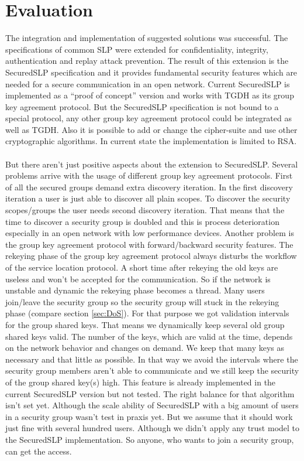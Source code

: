 \section{Evaluation}\label{sec:evaluation}
The integration and implementation of suggested solutions was successful. The specifications of common SLP were extended for confidentiality, integrity, authentication and replay attack prevention. The result of this extension is the SecuredSLP specification and it provides fundamental security features which are needed for a secure communication in an open network. Current SecuredSLP is implemented as a ``proof of concept'' version and works with TGDH as its group key agreement protocol. But the SecuredSLP specification is not bound to a special protocol, any other group key agreement protocol could be integrated as well as TGDH. Also it is possible to add or change the cipher-suite and use other cryptographic algorithms. In current state the implementation is limited to RSA.\\\\
But there aren't just positive aspects about the extension to SecuredSLP. Several problems arrive with the usage of different group key agreement protocols. First of all the secured groups demand extra discovery iteration. In the first discovery iteration a user is just able to discover all plain scopes. To discover the security scopes/groups the user needs second discovery iteration. That means that the time to discover a security group is doubled and this is process deterioration especially in an open network with low performance devices. Another problem is the group key agreement protocol with forward/backward security features. The rekeying phase of the group key agreement protocol always disturbs the workflow of the service location protocol. A short time after rekeying the old keys are useless and won't be accepted for the communication. So if the network is unstable and dynamic the rekeying phase becomes a thread. Many users join/leave the security group so the security group will stuck in the rekeying phase (compare section \ref{sec:DoS}). For that purpose we got validation intervals for the group shared keys. That means we dynamically keep several old group shared keys valid. The number of the keys, which are valid at the time, depends on the network behavior and changes on demand. We keep that many keys as necessary and that little as possible. In that way we avoid the intervals where the security group members aren't able to communicate and we still keep the security of the group shared key(s) high. This feature is already implemented in the current SecuredSLP version but not tested. The right balance for that algorithm isn't set yet. Although the scale ability of SecuredSLP with a big amount of users in a security group wasn't test in praxis yet. But we assume that it should work just fine with several hundred users. Although we didn't apply any trust model to the SecuredSLP implementation. So anyone, who wants to join a security group, can get the access.\\

